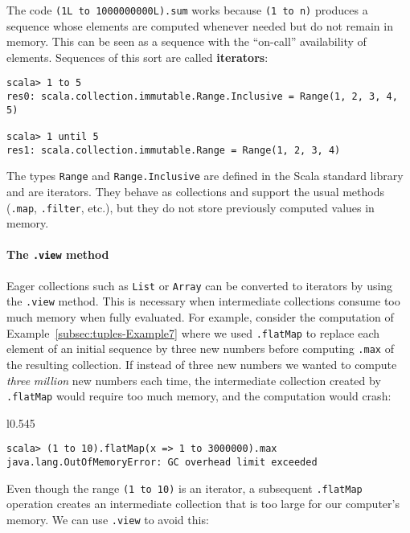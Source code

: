 \noindent The code \lstinline!(1L to 1000000000L).sum! works because
\lstinline!(1 to n)! produces a sequence whose elements are computed
whenever needed but do not remain in memory. This can be seen as a
sequence with the ``on-call'' availability of elements. Sequences
of this sort are called \textbf{iterators}:
\begin{lstlisting}
scala> 1 to 5
res0: scala.collection.immutable.Range.Inclusive = Range(1, 2, 3, 4, 5)

scala> 1 until 5
res1: scala.collection.immutable.Range = Range(1, 2, 3, 4)
\end{lstlisting}
The types \lstinline!Range! and \lstinline!Range.Inclusive! are
defined in the Scala standard library and are iterators. They behave
as collections and support the usual methods (\lstinline!.map!, \lstinline!.filter!,
etc.), but they do not store previously computed values in memory.

\paragraph{The \texttt{.view} method}

Eager collections such as \lstinline!List! or \lstinline!Array!
can be converted to iterators by using the \lstinline!.view! method.
This is necessary when intermediate collections consume too much memory
when fully evaluated. For example, consider the computation of Example~\ref{subsec:tuples-Example7}
where we used \lstinline!.flatMap! to replace each element of an
initial sequence by three new numbers before computing \lstinline!.max!
of the resulting collection. If instead of three new numbers we wanted
to compute \emph{three} \emph{million} new numbers each time, the
intermediate collection created by \lstinline!.flatMap! would require
too much memory, and the computation would crash:

\begin{wrapfigure}{l}{0.545\columnwidth}%
\vspace{-0.75\baselineskip}
\begin{lstlisting}
scala> (1 to 10).flatMap(x => 1 to 3000000).max
java.lang.OutOfMemoryError: GC overhead limit exceeded
\end{lstlisting}
\vspace{-0.75\baselineskip}
\end{wrapfigure}%

\noindent Even though the range \lstinline!(1 to 10)! is an iterator,
a subsequent \lstinline!.flatMap! operation creates an intermediate
collection that is too large for our computer's memory. We can use
\lstinline!.view! to avoid this:

